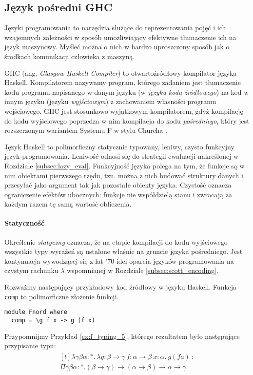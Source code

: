 \subsection{Język pośredni GHC}

Języki programowania to narzędzia służące do reprezentowania pojęć i ich wzajemnych zależności w sposób umożliwiający efektywne tłumaczenie ich na język maszynowy. Myśleć można o nich w bardzo uproszczony sposób jak o środkach komunikacji człowieka z maszyną.

GHC (ang. \emph{Glasgow Haskell Compiler}) to otwartoźródłowy kompilator języka Haskell. Kompilatorem nazywamy program, którego zadaniem jest tłumaczenie kodu programu napisanego w danym języku (w \emph{języku kodu źródłowego}) na kod w innym języku (języku \emph{wyjściowym}) z zachowaniem własności programu wejściowego. GHC jest stosunkowo wyjątkowym kompilatorem, gdyż kompilację do kodu wyjściowego poprzedza w nim kompilacja do kodu \emph{pośredniego}, który jest rozszerzonym wariantem Systemu F w stylu Churcha \cite{Sulzmann2007}. 

Język Haskell to polimorficzny statycznie typowany, leniwy, czysto funkcyjny język programowania. Leniwość odnosi się do strategii ewaluacji nakreślonej w Rozdziale \ref{subsec:lazy_eval}. Funkcyjność języka polega na tym, że funkcje są w nim obiektami pierwszego rzędu, tzn. można z nich budować struktury danych i przesyłać jako argument tak jak pozostałe obiekty języka. Czystość oznacza ograniczenie efektów ubocznych: funkcje nie współdzielą stanu i zwracają za każdym razem tę samą wartość obliczenia. 

\paragraph{Statyczność}
Określenie \emph{statyczny} oznacza, że na etapie kompilacji do kodu wyjściowego wszystkie typy wyrażeń są ustalone właśnie na gruncie języka pośredniego. Jest kontynuacja wywodzącej się z lat '70 idei oparcia języków programowania na czystym rachunku \(\lambda\) wspomnianej w Rozdziale \ref{subsec:scott_encoding}.

Rozważmy następujący przykładowy kod źródłowy w języku Haskell. Funkcja \texttt{comp} to polimorficzne złożenie funkcji.

\begin{verbatim}
module Fnord where
  comp = \g f x -> g (f x)
\end{verbatim}

Przypomnijmy Przykład \ref{ex:f_typing_5}, którego rezultatem było następujące przypisanie typu:
\begin{align}
  \begin{aligned}[t]
\lambda \gamma \beta \alpha:*.\,\lambda g: \beta \to \gamma\  f:\alpha\to\beta\ x:\alpha.\ g(f a)\ :\\
\Pi\gamma\beta\alpha:*.(\beta\to\gamma)\to(\alpha\to\beta)\to\alpha\to\gamma
  \end{aligned}\tag{\(\blacklozenge\)}\label{ex:typing_compar}
\end{align}

